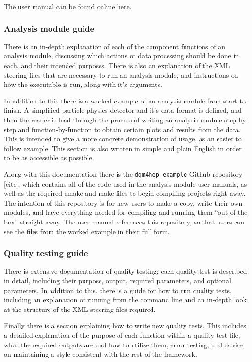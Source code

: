 The user manual can be found online here\cite{dqm4hep-user-manual}.

\subsubsection*{Analysis module guide}
There is an in-depth explanation of each of the component functions of an analysis module, discussing which actions or data processing should be done in each, and their intended purposes. There is also an explanation of the \acrshort{XML} steering files that are necessary to run an analysis module, and instructions on how the executable is run, along with it's arguments.

In addition to this there is a worked example of an analysis module from start to finish. A simplified particle physics detector and it's data format is defined, and then the reader is lead through the process of writing an analysis module step-by-step and function-by-function to obtain certain plots and results from the data. This is intended to give a more concrete demonstration of usage, as an easier to follow example. This section is also written in simple and plain English in order to be as accessible as possible.

Along with this documentation there is the \texttt{dqm4hep-example} Github repository [cite], which contains all of the code used in the analysis module user manuals, as well as the required cmake and make files to begin compiling projects right away. The intention of this repository is for new users to make a copy, write their own modules, and have everything needed for compiling and running them ``out of the box'' straight away. The user manual references this repository, so that users can see the files from the worked example in their full form.

\subsubsection*{Quality testing guide}
There is extensive documentation of quality testing; each quality test is described in detail, including their purpose, output, required parameters, and optional parameters. In addition to this, there is a guide for how to run quality tests, including an explanation of running from the command line and an in-depth look at the structure of the \acrshort{XML} steering files required.

Finally there is a section explaining how to write new quality tests. This includes a detailed explanation of the purpose of each function within a quality test file, what the required outputs are and how to utilise them, error testing, and advice on maintaining a style consistent with the rest of the framework.

